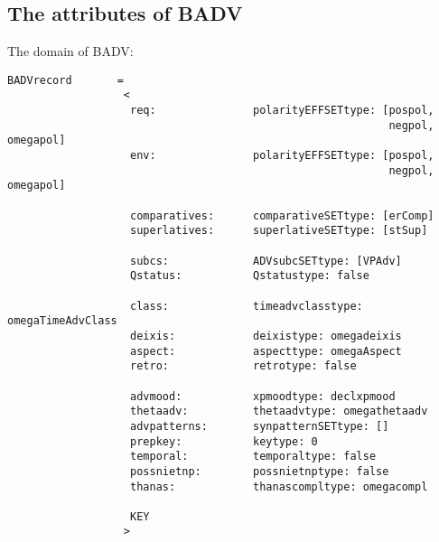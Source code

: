 \subsection{The attributes of BADV}

The domain of BADV:

\begin{verbatim}
BADVrecord       =
                  <
                   req:               polarityEFFSETtype: [pospol, 
                                                           negpol, omegapol]
                   env:               polarityEFFSETtype: [pospol, 
                                                           negpol, omegapol]

                   comparatives:      comparativeSETtype: [erComp]  
                   superlatives:      superlativeSETtype: [stSup]  

                   subcs:             ADVsubcSETtype: [VPAdv]
                   Qstatus:           Qstatustype: false

                   class:             timeadvclasstype: omegaTimeAdvClass
                   deixis:            deixistype: omegadeixis
                   aspect:            aspecttype: omegaAspect
                   retro:             retrotype: false

                   advmood:           xpmoodtype: declxpmood
                   thetaadv:          thetaadvtype: omegathetaadv
                   advpatterns:       synpatternSETtype: []
                   prepkey:           keytype: 0
                   temporal:          temporaltype: false
                   possnietnp:        possnietnptype: false
                   thanas:            thanascompltype: omegacompl

                   KEY
                  >
\end{verbatim}


